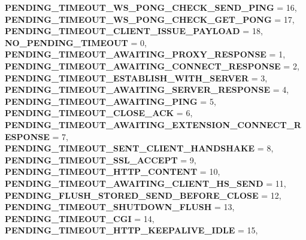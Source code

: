 \begin{DoxyCompactItemize}
\newline
{\bfseries P\+E\+N\+D\+I\+N\+G\+\_\+\+T\+I\+M\+E\+O\+U\+T\+\_\+\+W\+S\+\_\+\+P\+O\+N\+G\+\_\+\+C\+H\+E\+C\+K\+\_\+\+S\+E\+N\+D\+\_\+\+P\+I\+NG} = 16, 
{\bfseries P\+E\+N\+D\+I\+N\+G\+\_\+\+T\+I\+M\+E\+O\+U\+T\+\_\+\+W\+S\+\_\+\+P\+O\+N\+G\+\_\+\+C\+H\+E\+C\+K\+\_\+\+G\+E\+T\+\_\+\+P\+O\+NG} = 17, 
{\bfseries P\+E\+N\+D\+I\+N\+G\+\_\+\+T\+I\+M\+E\+O\+U\+T\+\_\+\+C\+L\+I\+E\+N\+T\+\_\+\+I\+S\+S\+U\+E\+\_\+\+P\+A\+Y\+L\+O\+AD} = 18, 
{\bfseries N\+O\+\_\+\+P\+E\+N\+D\+I\+N\+G\+\_\+\+T\+I\+M\+E\+O\+UT} = 0, 
\newline
{\bfseries P\+E\+N\+D\+I\+N\+G\+\_\+\+T\+I\+M\+E\+O\+U\+T\+\_\+\+A\+W\+A\+I\+T\+I\+N\+G\+\_\+\+P\+R\+O\+X\+Y\+\_\+\+R\+E\+S\+P\+O\+N\+SE} = 1, 
{\bfseries P\+E\+N\+D\+I\+N\+G\+\_\+\+T\+I\+M\+E\+O\+U\+T\+\_\+\+A\+W\+A\+I\+T\+I\+N\+G\+\_\+\+C\+O\+N\+N\+E\+C\+T\+\_\+\+R\+E\+S\+P\+O\+N\+SE} = 2, 
{\bfseries P\+E\+N\+D\+I\+N\+G\+\_\+\+T\+I\+M\+E\+O\+U\+T\+\_\+\+E\+S\+T\+A\+B\+L\+I\+S\+H\+\_\+\+W\+I\+T\+H\+\_\+\+S\+E\+R\+V\+ER} = 3, 
{\bfseries P\+E\+N\+D\+I\+N\+G\+\_\+\+T\+I\+M\+E\+O\+U\+T\+\_\+\+A\+W\+A\+I\+T\+I\+N\+G\+\_\+\+S\+E\+R\+V\+E\+R\+\_\+\+R\+E\+S\+P\+O\+N\+SE} = 4, 
\newline
{\bfseries P\+E\+N\+D\+I\+N\+G\+\_\+\+T\+I\+M\+E\+O\+U\+T\+\_\+\+A\+W\+A\+I\+T\+I\+N\+G\+\_\+\+P\+I\+NG} = 5, 
{\bfseries P\+E\+N\+D\+I\+N\+G\+\_\+\+T\+I\+M\+E\+O\+U\+T\+\_\+\+C\+L\+O\+S\+E\+\_\+\+A\+CK} = 6, 
{\bfseries P\+E\+N\+D\+I\+N\+G\+\_\+\+T\+I\+M\+E\+O\+U\+T\+\_\+\+A\+W\+A\+I\+T\+I\+N\+G\+\_\+\+E\+X\+T\+E\+N\+S\+I\+O\+N\+\_\+\+C\+O\+N\+N\+E\+C\+T\+\_\+\+R\+E\+S\+P\+O\+N\+SE} = 7, 
{\bfseries P\+E\+N\+D\+I\+N\+G\+\_\+\+T\+I\+M\+E\+O\+U\+T\+\_\+\+S\+E\+N\+T\+\_\+\+C\+L\+I\+E\+N\+T\+\_\+\+H\+A\+N\+D\+S\+H\+A\+KE} = 8, 
\newline
{\bfseries P\+E\+N\+D\+I\+N\+G\+\_\+\+T\+I\+M\+E\+O\+U\+T\+\_\+\+S\+S\+L\+\_\+\+A\+C\+C\+E\+PT} = 9, 
{\bfseries P\+E\+N\+D\+I\+N\+G\+\_\+\+T\+I\+M\+E\+O\+U\+T\+\_\+\+H\+T\+T\+P\+\_\+\+C\+O\+N\+T\+E\+NT} = 10, 
{\bfseries P\+E\+N\+D\+I\+N\+G\+\_\+\+T\+I\+M\+E\+O\+U\+T\+\_\+\+A\+W\+A\+I\+T\+I\+N\+G\+\_\+\+C\+L\+I\+E\+N\+T\+\_\+\+H\+S\+\_\+\+S\+E\+ND} = 11, 
{\bfseries P\+E\+N\+D\+I\+N\+G\+\_\+\+F\+L\+U\+S\+H\+\_\+\+S\+T\+O\+R\+E\+D\+\_\+\+S\+E\+N\+D\+\_\+\+B\+E\+F\+O\+R\+E\+\_\+\+C\+L\+O\+SE} = 12, 
\newline
{\bfseries P\+E\+N\+D\+I\+N\+G\+\_\+\+T\+I\+M\+E\+O\+U\+T\+\_\+\+S\+H\+U\+T\+D\+O\+W\+N\+\_\+\+F\+L\+U\+SH} = 13, 
{\bfseries P\+E\+N\+D\+I\+N\+G\+\_\+\+T\+I\+M\+E\+O\+U\+T\+\_\+\+C\+GI} = 14, 
{\bfseries P\+E\+N\+D\+I\+N\+G\+\_\+\+T\+I\+M\+E\+O\+U\+T\+\_\+\+H\+T\+T\+P\+\_\+\+K\+E\+E\+P\+A\+L\+I\+V\+E\+\_\+\+I\+D\+LE} = 15, 

\end{DoxyCompactItemize}
